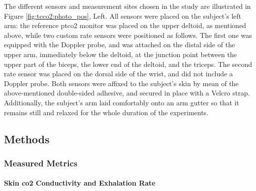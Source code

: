The different sensors and measurement sites chosen in the study are illustrated in Figure \ref{fig:tcco2:photo_pos}, Left. All sensors were placed on the subject's left arm: the reference \gls{ptco2} monitor was placed on the upper deltoid, as mentioned above, while two custom rate sensors were positioned as follows. The first one was equipped with the Doppler probe, and was attached on the distal side of the upper arm, immediately below the deltoid, at the junction point between the upper part of the biceps, the lower end of the deltoid, and the triceps. The second rate sensor was placed on the dorsal side of the wrist, and did not include a Doppler probe. Both sensors were affixed to the subject's skin by mean of the above-mentioned double-sided adhesive, and secured in place with a Velcro strap. Additionally, the subject's arm laid comfortably onto an arm gutter so that it remains still and relaxed for the whole duration of the experiments.

\subsection{Methods}\label{sect:methods}

\subsubsection{Measured Metrics}

\paragraph{Skin \texorpdfstring{\gls{co2}}{CO2} Conductivity and Exhalation Rate}\label{subsect:tcco2:co2_conductivity}\mbox{}\\

